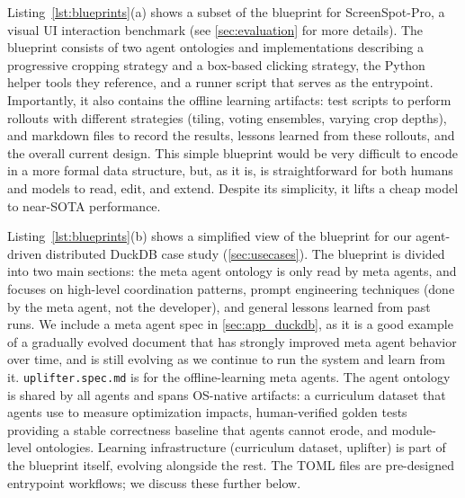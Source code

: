 Listing~\ref{lst:blueprints}(a) shows a subset of the blueprint for ScreenSpot-Pro, a visual UI interaction benchmark (see \cref{sec:evaluation} for more details).
The blueprint consists of two agent ontologies and implementations describing a progressive cropping strategy and a box-based clicking strategy, the Python helper tools they reference, and a runner script that serves as the entrypoint.
Importantly, it also contains the offline learning artifacts: test scripts to perform rollouts with different strategies (tiling, voting ensembles, varying crop depths), and markdown files to record the results, lessons learned from these rollouts, and the overall current design. 
This simple blueprint would be very difficult to encode in a more formal data structure, but, as it is, is straightforward for both humans and models to read, edit, and extend. Despite its simplicity, it lifts a cheap model to near-SOTA performance.

Listing~\ref{lst:blueprints}(b) shows a simplified view of the blueprint for our agent-driven distributed DuckDB case study (\cref{sec:usecases}). 
The blueprint is divided into two main sections: the meta agent ontology is only read by meta agents, and focuses on high-level coordination patterns, prompt engineering techniques (done by the meta agent, not the developer), and general lessons learned from past runs. We include a meta agent spec in \cref{sec:app_duckdb}, as it is a good example of a gradually evolved document that has strongly improved meta agent behavior over time, and is still evolving as we continue to run the system and learn from it. \texttt{uplifter.spec.md} is for the offline-learning meta agents.
The agent ontology is shared by all agents and spans OS-native artifacts: a curriculum dataset that agents use to measure optimization impacts, human-verified golden tests providing a stable correctness baseline that agents cannot erode, and module-level ontologies.
Learning infrastructure (curriculum dataset, uplifter) is part of the blueprint itself, evolving alongside the rest. The TOML files are pre-designed entrypoint workflows; we discuss these further below.


